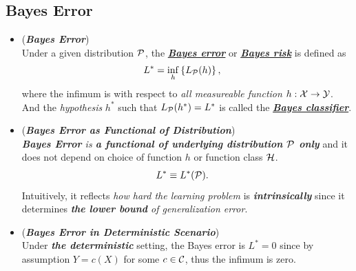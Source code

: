 \documentclass[11pt]{article}
\begin{document}
\begin{itemize}
\end{itemize}

\subsection{Bayes Error}
\begin{itemize}
\item  \begin{definition} (\emph{\textbf{Bayes Error}})\\
Under a given distribution ${\mathcal P}$,  the \underline{\emph{\textbf{Bayes error}}} or \underline{\emph{\textbf{Bayes risk}}} is defined as 
\begin{align}
L^{*}  &= \inf_{h}\left\{L_{{\mathcal P}}(h)\right\}, \label{expr: Bayes_err}
\end{align} where the infimum is with respect to \emph{all measureable function} $h: {\mathcal X} \rightarrow {\mathcal Y}$. And the \emph{hypothesis} $h^{*}$ such that $L_{{\mathcal P}}(h^{*})= L^{*}$ is called the \underline{\emph{\textbf{Bayes classifier}}}.
\end{definition}

\item \begin{remark} (\textbf{\emph{Bayes Error as Functional of Distribution}})\\
\emph{\textbf{Bayes Error} is \textbf{a functional of underlying distribution ${\mathcal P}$ only}} and it does not depend on choice of function $h$ or function class ${\mathcal H}$.
\begin{align*}
 L^{*} & \equiv  L^{*}({\mathcal P}).
\end{align*} Intuitively, it reflects \emph{how hard the learning problem} is \emph{\textbf{intrinsically}} since it determines \emph{\textbf{the lower bound} of generalization error}.
\end{remark}

\item \begin{remark}  (\emph{\textbf{Bayes Error in Deterministic Scenario}})\\
Under \emph{\textbf{the deterministic}} setting, the Bayes error is $L^{*}=0$ since by assumption $Y = c(X)$ for some $c \in {\mathcal C}$, thus the infimum is zero. 
\end{remark}


\end{itemize}
\end{document}
